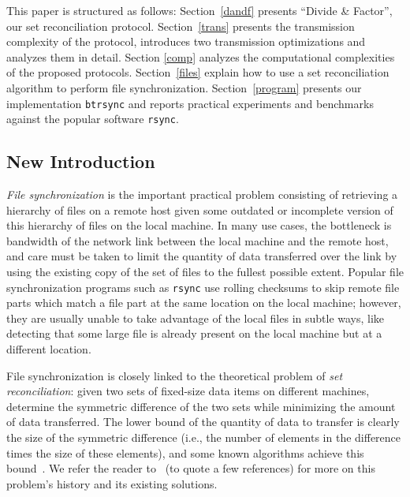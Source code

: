 \documentclass[11pt]{llncs}
\newcommand{\btrsync}{\texttt{btrsync}\xspace}
\newcommand{\rsync}{\texttt{rsync}\xspace}
\begin{document}
This paper is structured as follows: Section~\ref{dandf} presents ``Divide \&
Factor'', our set reconciliation protocol. Section~\ref{trans} presents the
transmission complexity of the protocol, introduces two transmission
optimizations and analyzes them in detail. Section \ref{comp} analyzes the
computational complexities of the proposed protocols. Section~\ref{files}
explain how to use a set reconciliation algorithm to perform file
synchronization. Section~\ref{program} presents our implementation \btrsync and
reports practical experiments and benchmarks against the popular software
\rsync.\smallskip

\subsection*{New Introduction}

\emph{File synchronization} is the important practical problem consisting of
retrieving a hierarchy of files on a remote host given some outdated or
incomplete version of this hierarchy of files on the local machine. In many use
cases, the bottleneck is bandwidth of the network link between the local machine
and the remote host, and care must be taken to limit the quantity of data
transferred over the link by using the existing copy of the set of files to the
fullest possible extent. Popular file synchronization programs such as \rsync
use rolling checksums to skip remote file parts which match a file part at the
same location on the local machine; however, they are usually unable to take
advantage of the local files in subtle ways, like detecting that some large file
is already present on the local machine but at a different location.

File synchronization is closely linked to the theoretical problem of \emph{set
reconciliation}: given two sets of fixed-size data items on different machines,
determine the symmetric difference of the two sets while minimizing the amount
of data transferred. The lower bound of the quantity of data to transfer is
clearly the size of the symmetric difference (i.e., the number of elements in the
difference times the size of these elements), and some known algorithms achieve
this bound~\cite{PSRec}. We refer the reader to~\cite{PSRec,Mins1,Whats} (to
quote a few references) for more on this problem's history and its existing
solutions.
\end{document}
